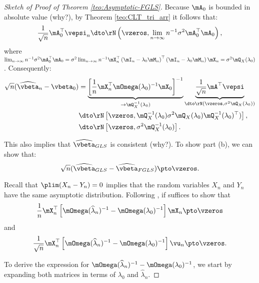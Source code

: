 \begin{proof}[Sketch of Proof of Theorem \ref{teo:Asymptotic-FGLS}]
Because $\mA_0$ is bounded in absolute value (why?), by Theorem \ref{teo:CLT_tri_arr} it follows that:
\begin{equation*}
\frac{1}{\sqrt{n}}\mA^\top_0\vepsi_n  \dto \rN\left(\vzeros, \lim_{n\to\infty}n^{-1}\sigma^2\mA^\top_0\mA_0\right), 
\end{equation*}
%
where  $\lim_{n\to\infty}n^{-1}\sigma^2\mA^\top_0\mA_0 = \sigma^2\lim_{n\to\infty}n^{-1}\mX^\top_n\left(\mI_n - \lambda_0\mM_n\right)^\top\left(\mI_n - \lambda_0\mM_n\right)\mX_n=\sigma^2\mQ_X(\lambda_0)$. Consequently:
\begin{equation*}
  \begin{aligned}
  \sqrt{n}(\widehat{\vbeta}_n - \vbeta_0) & =  \underbrace{\left[\frac{1}{n}\mX^\top_n\mOmega(\lambda_0)^{-1}\mX_0\right]^{-1}}_{\to \mQ_X^{-1}(\lambda_0)}\underbrace{\frac{1}{\sqrt{n}}\mA^\top\vepsi}_{\dto \rN(\vzeros, \sigma^2\mQ_X(\lambda_0))} \\
   & \dto \rN\left[\vzeros, \mQ_X^{-1}(\lambda_0)\sigma^2\mQ_X(\lambda_0)\mQ_X^{-1}(\lambda_0)^\top)\right], \\
   & \dto \rN\left[\vzeros, \sigma^2\mQ_X^{-1}(\lambda_0)\right].
  \end{aligned}
\end{equation*}

This also implies that $\widehat{\vbeta}_{GLS}$ is consistent (why?). To show part (b), we can show that:
\begin{equation*}
  \sqrt{n}(\widehat{\vbeta}_{GLS} - \widehat{\vbeta}_{FGLS}) \pto \vzeros.
\end{equation*}

Recall that $\plim(X_n- Y_n) = 0$ implies that the random variables $X_n$ and $Y_n$ have the same asymptotic distribution. Following \cite{kelejian1999generalized}, if suffices to show that 
\begin{equation}\label{eq:omega-omega}
\frac{1}{n}\mX^\top_n\left[\mOmega(\widehat{\lambda}_n)^{-1}- \mOmega(\lambda_0)^{-1}\right]\mX_n\pto \vzeros
\end{equation}
%
and
\begin{equation*}
\frac{1}{\sqrt{n}}\mX^\top_n\left[\mOmega(\widehat{\lambda}_n)^{-1}- \mOmega(\lambda_0)^{-1}\right]\vu_n\pto \vzeros.
\end{equation*}


To derive the expression for \(\mOmega(\widehat{\lambda}_n)^{-1} - \mOmega(\lambda_0)^{-1}\), we start by expanding both matrices in terms of \( \lambda_0\) and \(\widehat{\lambda}_n\).


\end{proof}
